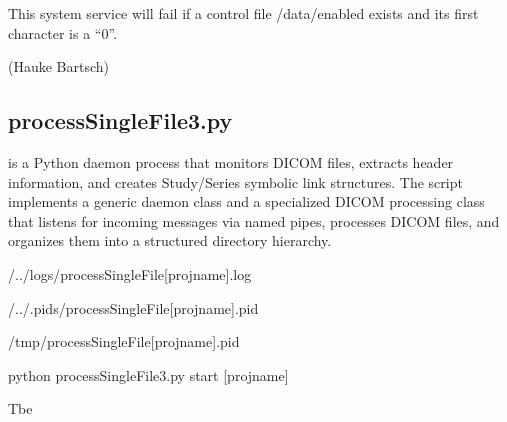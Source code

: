 \documentclass[letterpaper,10pt,english]{sphinxmanual}
\begin{document}
\sphinxAtStartPar
This system service will fail if a control file /data/enabled exists and  its first character is a “0”.

\sphinxAtStartPar
(Hauke Bartsch)

\sphinxstepscope


\subsection{processSingleFile3.py}
\label{\detokenize{Architecture/scripts/processSingleFile3:processsinglefile3-py}}\label{\detokenize{Architecture/scripts/processSingleFile3::doc}}
\sphinxAtStartPar
{} is a Python daemon process that monitors DICOM files, extracts header information, and creates Study/Series symbolic link structures. The script implements a generic daemon class and a specialized DICOM processing class that listens for incoming messages via named pipes, processes DICOM files, and organizes them into a structured directory hierarchy.

\sphinxAtStartPar
{}

\begin{DUlineblock}{0em}
\item[] \sphinxhyphen{} 
\item[] \sphinxhyphen{} 
\item[] \sphinxhyphen{}  /../logs/processSingleFile{[}projname{]}.log
\item[] \sphinxhyphen{} 
\item[]
\begin{DUlineblock}{\DUlineblockindent}
\item[] \sphinxhyphen{}        /../.pids/processSingleFile{[}projname{]}.pid
\item[] \sphinxhyphen{}       /tmp/processSingleFile{[}projname{]}.pid
\end{DUlineblock}
\item[] \sphinxhyphen{}  python processSingleFile3.py start {[}projname{]}
\item[] \sphinxhyphen{}  Tbe
\end{DUlineblock}

\sphinxAtStartPar
{}
\end{document}
